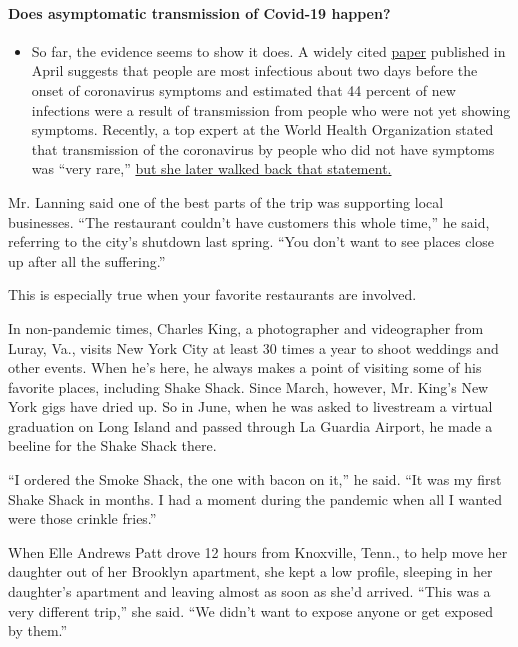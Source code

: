 \begin{itemize}
{  \paragraph{Does asymptomatic transmission of Covid-19
  happen?}\label{does-asymptomatic-transmission-of-covid-19-happen}}

  \begin{itemize}
  \tightlist
  \item
    So far, the evidence seems to show it does. A widely cited
    \href{https://www.nature.com/articles/s41591-020-0869-5}{paper}
    published in April suggests that people are most infectious about
    two days before the onset of coronavirus symptoms and estimated that
    44 percent of new infections were a result of transmission from
    people who were not yet showing symptoms. Recently, a top expert at
    the World Health Organization stated that transmission of the
    coronavirus by people who did not have symptoms was ``very rare,''
    \href{https://www.nytimes.com/2020/06/09/world/coronavirus-updates.html?action=click\&pgtype=Article\&state=default\&region=MAIN_CONTENT_3\&context=storylines_faq\#link-1f302e21}{but
    she later walked back that statement.}
  \end{itemize}
\end{itemize}

Mr. Lanning said one of the best parts of the trip was supporting local
businesses. ``The restaurant couldn't have customers this whole time,''
he said, referring to the city's shutdown last spring. ``You don't want
to see places close up after all the suffering.''

This is especially true when your favorite restaurants are involved.

In non-pandemic times, Charles King, a photographer and videographer
from Luray, Va., visits New York City at least 30 times a year to shoot
weddings and other events. When he's here, he always makes a point of
visiting some of his favorite places, including Shake Shack. Since
March, however, Mr. King's New York gigs have dried up. So in June, when
he was asked to livestream a virtual graduation on Long Island and
passed through La Guardia Airport, he made a beeline for the Shake Shack
there.

``I ordered the Smoke Shack, the one with bacon on it,'' he said. ``It
was my first Shake Shack in months. I had a moment during the pandemic
when all I wanted were those crinkle fries.''

When Elle Andrews Patt drove 12 hours from Knoxville, Tenn., to help
move her daughter out of her Brooklyn apartment, she kept a low profile,
sleeping in her daughter's apartment and leaving almost as soon as she'd
arrived. ``This was a very different trip,'' she said. ``We didn't want
to expose anyone or get exposed by them.''

